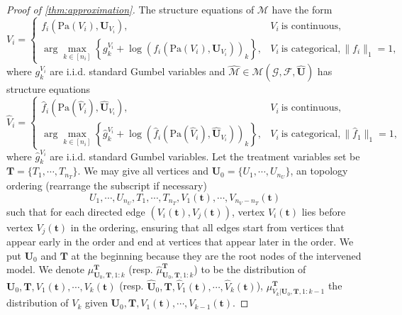 \begin{proof}[Proof of \cref{thm:approximation}]\label{proof:approximation}
 The structure equations of $ \mathcal{M}$ have the form 
\begin{equation*}
V_{i} =\begin{cases}
f_{i}\left(\text{Pa} (V_{i} ),\boldsymbol{U}_{V_{i}}\right) , & V_{i} \ \text{is continuous} ,\\
\arg\max_{k\in [ n_{i}]}\left\{g_{k}^{V_{i}} +\log\left( f_{i}\left(\text{Pa}( V_{i}) ,\boldsymbol{U}_{V_{i}}\right)\right)_{k}\right\} , & V_{i} \ \text{is categorical} , \|f_i\|_1 = 1,
\end{cases}
\end{equation*}where $ g_{k}^{V_{i}}$ are i.i.d. standard Gumbel variables and $ \hat{\mathcal{M}} \in \mathcal{M}(\mathcal{G} ,\hat{\mathcal{F}} ,\hat{\boldsymbol{U}})$ has structure equations 
\begin{equation*}
\hat{V}_{i} =\begin{cases}
\hat{f}_{i}\left(\text{Pa} (\hat{V}_{i} ),\hat{\boldsymbol{U}}_{V_{i}}\right) , & V_{i} \ \text{is continuous} ,\\
\arg\max_{k\in [ n_{i}]}\left\{\hat{g}_{k}^{V_{i}} +\log\left(\hat{f}_{i}\left(\text{Pa}(\hat{V}_{i}) ,\hat{\boldsymbol{U}}_{V_{i}}\right)\right)_{k}\right\} , & V_{i} \ \text{is categorical} , \|\hat{f}_1\|_1 = 1,
\end{cases}
\end{equation*}
where $ \hat{g}_{k}^{V_{i}}$ are i.i.d. standard Gumbel variables. Let the treatment variables set be $ \boldsymbol{T} =\{T_{1} ,\cdots ,T_{n_{T}}\} $. We may give all vertices and $ \boldsymbol{U}_0 = \{ U_1,\cdots,U_{n_U}\}$, an topology ordering (rearrange the subscript if necessary) 
  \begin{equation*}
  U_{1} ,\cdots ,U_{n_{U}} ,T_{1} ,\cdots ,T_{n_{T}} ,V_{1}(\boldsymbol{t}) ,\cdots ,V_{n_{V} - n_{T}}(\boldsymbol{t})
  \end{equation*}
  such that for each directed edge $(V_{i}(\boldsymbol{t}) ,V_{j}(\boldsymbol{t}) ) $, vertex $V_{i}(\boldsymbol{t})$ lies before vertex $V_{j}(\boldsymbol{t})$ in the ordering, ensuring that all edges start from vertices that appear early in the order and end at vertices that appear later in the order. We put $ \boldsymbol{U}_0 $ and $\boldsymbol{T}$ at the beginning because they are the root nodes of the intervened model. We denote $ \mu _{\boldsymbol{U}_0 ,\boldsymbol{T} ,1:k}^{\boldsymbol{T}}$ (resp. $ \hat{\mu }_{\boldsymbol{U}_0 ,\boldsymbol{T} ,1:k}^{\boldsymbol{T}}$) to be the distribution of $ \boldsymbol{U}_0 ,\boldsymbol{T} ,V_{1}(\boldsymbol{t}) ,\cdots ,V_{k}(\boldsymbol{t})$ (resp. $ \hat{\boldsymbol{U}}_0 ,\boldsymbol{T} ,\hat{V}_{1}(\boldsymbol{t}) ,\cdots ,\hat{V}_{k}(\boldsymbol{t})$), $ \mu _{V_{k} |\boldsymbol{U}_0 ,\boldsymbol{T} ,1:k-1}^{\boldsymbol{T}}$ the distribution of $ V_{k}$ given $ \boldsymbol{U}_0 ,\boldsymbol{T} ,V_{1}(\boldsymbol{t}) ,\cdots ,V_{k-1}(\boldsymbol{t})$.


\end{proof}
